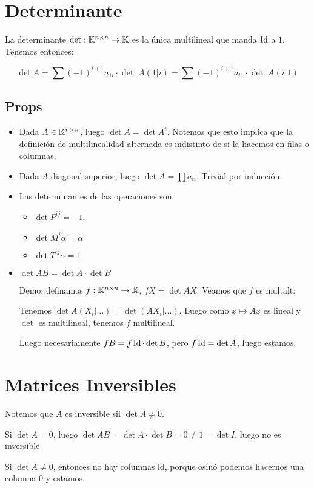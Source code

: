 \documentclass{article}
\begin{document}
\section*{Determinante}
La determinante $\det: \mathbb{K}^{n \times n} \to \mathbb{K}$ es la única multilineal que manda $\operatorname{Id}$ a $1$. Tenemos entonces:

\[
	\det A
	= \sum (-1)^{i+1} a_{1i} \cdot \det \;A(1|i)
	= \sum (-1)^{i+1} a_{i1} \cdot \det \;A(i|1)
\]

\subsection*{Props}
\begin{itemize}
 \item Dada $A \in \mathbb{K}^{n \times n}$, luego $\det A = \det A^t$. Notemos que esto implica que la definición de multilinealidad alternada es indistinto de si la hacemos en filas o columnas.
 \item Dada $A$ diagonal superior, luego $\det A = \prod a_{ii}$. Trivial por inducción.
 \item Las determinantes de las operaciones son:
	 \begin{itemize}
		 \item $\det P^{ij} = -1$.
		 \item $\det M^i \alpha = \alpha$
		 \item $\det T^{ij}\alpha = 1$
	 \end{itemize}
 \item $\det AB = \det A \cdot \det B$

	 Demo: definamos $f : \mathbb{K}^{n \times n} \to \mathbb{K}$, $f X = \det AX$. Veamos que $f$ es multalt:

	 Tenemos $\det A(X_i | \dots) = \det (AX_i | \dots)$. Luego como $x \mapsto Ax$ es lineal y $\det$ es multilineal, tenemos $f$ multilineal. 

	 Luego necesariamente $f B = f \operatorname{Id} \cdot \det B$, pero $f\operatorname{Id} = \det A$, luego estamos.
\end{itemize}

\section*{Matrices Inversibles}
Notemos que $A$ es inversible sii $\det A \neq 0$.

Si $\det A = 0$, luego $\det AB = \det A \cdot \det B = 0 \neq 1 = \det I$, luego no es inversible

Si $\det A \neq 0$, entonces no hay columnas ld, porque osinó podemos hacernos una columna $0$ y estamos.
\end{document}
